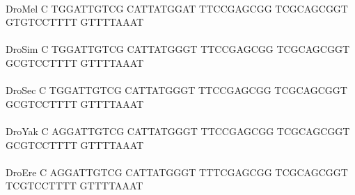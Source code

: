 \documentclass[11pt,twoside,reqno,a4paper]{article}
\begin{document}
{\\
DroMel	C	TGGATTGTCG	CATTATGGAT	TTCCGAGCGG	TCGCAGCGGT	GTGTCCTTTT	GTTTTAAAT\\
\hspace*{7\charwidth}\hspace*{1\charwidth}\hspace*{1\charwidth}\hspace*{1\charwidth}\hspace*{1\charwidth}\hspace*{1\charwidth}\hspace*{1\charwidth}\\
DroSim	C	TGGATTGTCG	CATTATGGGT	TTCCGAGCGG	TCGCAGCGGT	GCGTCCTTTT	GTTTTAAAT\\
\hspace*{7\charwidth}\hspace*{1\charwidth}\hspace*{1\charwidth}\hspace*{1\charwidth}\hspace*{1\charwidth}\hspace*{1\charwidth}\hspace*{1\charwidth}\\
DroSec	C	TGGATTGTCG	CATTATGGGT	TTCCGAGCGG	TCGCAGCGGT	GCGTCCTTTT	GTTTTAAAT\\
\hspace*{7\charwidth}\hspace*{1\charwidth}\hspace*{1\charwidth}\hspace*{1\charwidth}\hspace*{1\charwidth}\hspace*{1\charwidth}\hspace*{1\charwidth}\\
DroYak	C	AGGATTGTCG	CATTATGGGT	TTCCGAGCGG	TCGCAGCGGT	GCGTCCTTTT	GTTTTAAAT\\
\hspace*{7\charwidth}\hspace*{1\charwidth}\hspace*{1\charwidth}\hspace*{1\charwidth}\hspace*{1\charwidth}\hspace*{1\charwidth}\hspace*{1\charwidth}\\
DroEre	C	AGGATTGTCG	CATTATGGGT	TTTCGAGCGG	TCGCAGCGGT	TCGTCCTTTT	GTTTTAAAT\\
\hspace*{7\charwidth}\hspace*{1\charwidth}\hspace*{1\charwidth}\hspace*{1\charwidth}\hspace*{1\charwidth}\hspace*{1\charwidth}\hspace*{1\charwidth}\\
}
\end{document}
